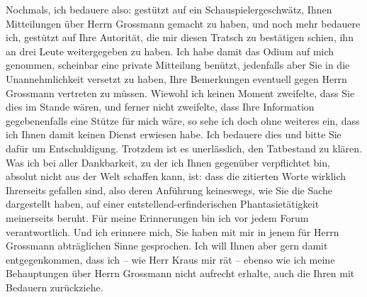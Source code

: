 \pstart
           Nochmals, ich bedauere also: gestützt auf ein Schauspielergeschwätz, Ihnen
               Mitteilungen über Herrn Grossmann gemacht zu
               haben, und noch mehr bedauere ich, gestützt auf Ihre Autorität, die mir diesen
               Tratsch zu bestätigen schien, ihn an drei Leute weitergegeben zu haben. Ich habe
               damit das Odium auf mich genommen, scheinbar eine private Mitteilung benützt,
               jedenfalls aber Sie in die Unannehmlichkeit versetzt zu haben, Ihre Bemerkungen
               eventuell gegen Herrn Grossmann vertreten zu
               müssen. Wiewohl ich keinen Moment zweifelte, dass Sie dies im Stande wären, und
               ferner nicht zweifelte, dass Ihre Information gegebenenfalls eine Stütze für mich
               wäre, so sehe ich doch ohne weiteres ein, dass ich Ihnen damit keinen Dienst erwiesen
               habe. Ich bedauere dies und bitte Sie dafür um Entschuldigung. Trotzdem ist es un{\pb}erlässlich, den Tatbestand zu klären. Was ich bei
               aller Dankbarkeit, zu der ich Ihnen gegenüber verpflichtet bin, absolut nicht aus der
               Welt schaffen kann, ist: dass die zitierten Worte wirklich Ihrerseits gefallen sind,
               also deren Anführung keineswegs, wie Sie die Sache dargestellt haben, auf einer
               entstellend-erfinderischen Phantasietätigkeit meinerseits beruht. Für meine
               Erinnerungen bin ich vor jedem Forum verantwortlich. Und ich erinnere mich, Sie haben
               mit mir in jenem für Herrn Grossmann
               abträglichen Sinne gesprochen. Ich will Ihnen aber gern damit entgegenkommen, dass
               ich – wie Herr Kraus mir rät – ebenso wie ich
               meine Behauptungen über Herrn Grossmann nicht
               aufrecht erhalte, auch die Ihren mit Bedauern zurückziehe.\pend
           
